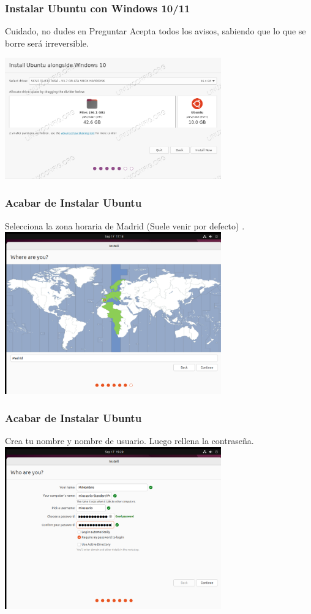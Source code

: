 \documentclass[10pt]{beamer}
\begin{document}
	\begin{frame}
		\frametitle{Instalar Ubuntu con Windows 10/11}
		\begin{alertblock}{Cuidado, no dudes en Preguntar}
			Acepta todos los avisos, sabiendo que lo que se borre será irreversible.
		\end{alertblock}
		
		\includegraphics[width=0.7\textwidth]{windows-10-2}
	\end{frame}
	
	\begin{frame}
		\frametitle{Acabar de Instalar Ubuntu}
		Selecciona la zona horaria de Madrid (Suele venir por defecto)
		.
		\includegraphics[width=0.7\textwidth]{timezone}
	\end{frame}
	
	\begin{frame}
		\frametitle{Acabar de Instalar Ubuntu}
		Crea tu nombre y nombre de usuario. Luego rellena la contraseña.
		\includegraphics[width=0.7\textwidth]{login}
	\end{frame}
	
\end{document}
